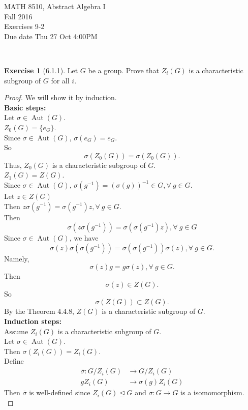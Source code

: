\documentclass{amsart}
\theoremstyle{plain}
\theoremstyle{definition}
\newtheorem{exer}[lem]{Exercise}
\begin{document}
\noindent MATH 8510, Abstract Algebra I \\
Fall 2016\\
Exercises 9-2\\
Due date Thu 27 Oct 4:00PM

\

%
%

\begin{exer}[6.1.1]
Let $G$ be a group. 
Prove that $Z_i(G)$ is a characteristic subgroup of $G$ for all $i$. 
\begin{proof}
	We will show it by induction.\\
	\textbf{ Basic steps:}\\
	Let $\sigma \in \operatorname{Aut}(G)$.\\
	$Z_0(G) =\{e_G\}$.\\
	Since $\sigma \in \operatorname{Aut}(G)$, $\sigma(e_G) = e_G$. \\
	So
	\[\sigma(Z_0(G)) = \sigma(Z_0(G)).\]
	Thus, $Z_0(G)$ is a characteristic subgroup of $G$.\\
	$Z_1(G) = Z(G)$. \\
	Since $\sigma \in \operatorname{Aut}(G)$, $\sigma(g^{-1})  = (\sigma(g))^{-1} \in G, \forall\ g \in G$.\\
	Let $z \in Z(G)$\\
	Then $z\sigma(g^{-1}) = \sigma(g^{-1})z, \forall\ g \in G$.\\
    Then
    \[\sigma(z\sigma(g^{-1})) = \sigma(\sigma(g^{-1})z), \forall\ g \in G\]
    Since $\sigma \in \operatorname{Aut}(G)$, we have 
    \[\sigma(z)\sigma\left(\sigma(g^{-1})\right) = \sigma\left(\sigma(g^{-1})\right)\sigma(z), \forall\ g \in G.\]
    Namely,
    \[\sigma(z)g = g\sigma(z), \forall\ g \in G.\]
    Then 
    \[\sigma(z) \in Z(G).\]
    So
	\[\sigma(Z(G)) \subset Z(G).\]
	By the Theorem 4.4.8, $Z(G)$ is a characteristic subgroup of $G$.\\
	\textbf{Induction steps: }\\
	Assume $Z_i(G)$ is a characteristic subgroup of $G$.\\
	Let $\sigma \in \operatorname{Aut}(G)$.\\
	Then $\sigma(Z_i(G)) = Z_i(G)$.\\
	Define 
	\begin{align*}
	  \overline{\sigma} : G/Z_i(G) &\to G/Z_i(G) \\
	  						gZ_i(G) &\to \sigma(g)Z_i(G)  
	\end{align*}
	Then $\overline{\sigma}$ is well-defined since $Z_i(G) \unlhd G$ and $\sigma:G\to G$ is a isomomorphism.\\

\end{proof}
\end{exer}
\end{document}

